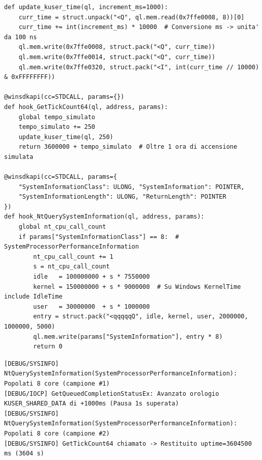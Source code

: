 \documentclass[11pt, a4paper]{article}
\begin{document}
\begin{lstlisting}[style=pythoncode, caption={Avanzamento di KUSER\_SHARED\_DATA, falsificazione dell'uptime (>1 ora) e simulazione del carico CPU.}, label={lst:gorat_time}]
def update_kuser_time(ql, increment_ms=1000):
    curr_time = struct.unpack("<Q", ql.mem.read(0x7ffe0008, 8))[0]
    curr_time += int(increment_ms) * 10000  # Conversione ms -> unita' da 100 ns
    ql.mem.write(0x7ffe0008, struct.pack("<Q", curr_time))
    ql.mem.write(0x7ffe0014, struct.pack("<Q", curr_time))
    ql.mem.write(0x7ffe0320, struct.pack("<I", int(curr_time // 10000) & 0xFFFFFFFF))

@winsdkapi(cc=STDCALL, params={})
def hook_GetTickCount64(ql, address, params):
    global tempo_simulato
    tempo_simulato += 250
    update_kuser_time(ql, 250)
    return 3600000 + tempo_simulato  # Oltre 1 ora di accensione simulata

@winsdkapi(cc=STDCALL, params={
    "SystemInformationClass": ULONG, "SystemInformation": POINTER,
    "SystemInformationLength": ULONG, "ReturnLength": POINTER
})
def hook_NtQuerySystemInformation(ql, address, params):
    global nt_cpu_call_count
    if params["SystemInformationClass"] == 8:  # SystemProcessorPerformanceInformation
        nt_cpu_call_count += 1
        s = nt_cpu_call_count
        idle   = 100000000 + s * 7550000
        kernel = 150000000 + s * 9000000  # Su Windows KernelTime include IdleTime
        user   = 30000000  + s * 1000000
        entry = struct.pack("<qqqqqQ", idle, kernel, user, 2000000, 1000000, 5000)
        ql.mem.write(params["SystemInformation"], entry * 8)
        return 0
\end{lstlisting}


\noindent\begin{minipage}{\linewidth}
\begin{lstlisting}[style=consoleout, caption={Superamento del campionamento CPU su 8 core, avanzamento IOCP/KUSER\_SHARED\_DATA e verifica dell'uptime.}, label={lst:gorat_time_out}]
[DEBUG/SYSINFO] NtQuerySystemInformation(SystemProcessorPerformanceInformation): Popolati 8 core (campione #1)
[DEBUG/IOCP] GetQueuedCompletionStatusEx: Avanzato orologio KUSER_SHARED_DATA di +1000ms (Pausa 1s superata)
[DEBUG/SYSINFO] NtQuerySystemInformation(SystemProcessorPerformanceInformation): Popolati 8 core (campione #2)
[DEBUG/SYSINFO] GetTickCount64 chiamato -> Restituito uptime=3604500 ms (3604 s)
\end{lstlisting}
\end{minipage}
\end{document}
